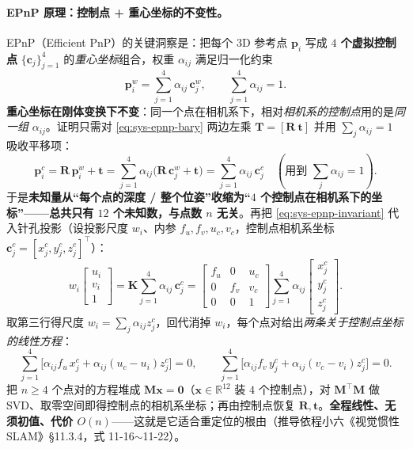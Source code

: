 \paragraph{EPnP 原理：控制点 + 重心坐标的不变性。}
EPnP（Efficient PnP）的关键洞察是：把每个 3D 参考点 $\mathbf{p}_i$ 写成 \textbf{$4$ 个虚拟控制点} $\{\mathbf{c}_j\}_{j=1}^4$ 的\emph{重心坐标}组合，权重 $\alpha_{ij}$ 满足归一化约束
\begin{equation}
\mathbf{p}_i^{w}=\sum_{j=1}^{4}\alpha_{ij}\,\mathbf{c}_j^{w},\qquad
\sum_{j=1}^{4}\alpha_{ij}=1 .
\label{eq:sys-epnp-bary}
\end{equation}
\textbf{重心坐标在刚体变换下不变}：同一个点在相机系下，相对\emph{相机系的控制点}用的是\emph{同一组} $\alpha_{ij}$。证明只需对 \cref{eq:sys-epnp-bary} 两边左乘 $\mathbf{T}=[\mathbf{R}\ \mathbf{t}]$ 并用 $\sum_j\alpha_{ij}=1$ 吸收平移项：
\begin{equation}
\mathbf{p}_i^{c}=\mathbf{R}\,\mathbf{p}_i^{w}+\mathbf{t}
=\sum_{j=1}^{4}\alpha_{ij}\big(\mathbf{R}\,\mathbf{c}_j^{w}+\mathbf{t}\big)
=\sum_{j=1}^{4}\alpha_{ij}\,\mathbf{c}_j^{c}
\quad(\text{用到 }\textstyle\sum_j\alpha_{ij}=1).
\label{eq:sys-epnp-invariant}
\end{equation}
于是\textbf{未知量从“每个点的深度 / 整个位姿”收缩为“$4$ 个控制点在相机系下的坐标”——总共只有 $12$ 个未知数，与点数 $n$ 无关}。再把 \cref{eq:sys-epnp-invariant} 代入针孔投影（设投影尺度 $w_i$、内参 $f_u,f_v,u_c,v_c$，控制点相机系坐标 $\mathbf{c}_j^c=[x_j^c,y_j^c,z_j^c]^\top$）：
\begin{equation}
w_i\begin{bmatrix}u_i\\ v_i\\ 1\end{bmatrix}
=\mathbf{K}\sum_{j=1}^{4}\alpha_{ij}\,\mathbf{c}_j^{c}
=\begin{bmatrix}f_u&0&u_c\\ 0&f_v&v_c\\ 0&0&1\end{bmatrix}
\sum_{j=1}^{4}\alpha_{ij}\begin{bmatrix}x_j^c\\ y_j^c\\ z_j^c\end{bmatrix}.
\label{eq:sys-epnp-proj}
\end{equation}
取第三行得尺度 $w_i=\sum_{j}\alpha_{ij}z_j^c$，回代消掉 $w_i$，每个点对给出\emph{两条关于控制点坐标的线性方程}：
\begin{equation}
\sum_{j=1}^{4}\!\big[\alpha_{ij}f_u\,x_j^c+\alpha_{ij}(u_c-u_i)z_j^c\big]=0,\qquad
\sum_{j=1}^{4}\!\big[\alpha_{ij}f_v\,y_j^c+\alpha_{ij}(v_c-v_i)z_j^c\big]=0 .
\label{eq:sys-epnp-linear}
\end{equation}
把 $n\ge 4$ 个点对的方程堆成 $\mathbf{M}\mathbf{x}=\mathbf{0}$（$\mathbf{x}\in\mathbb{R}^{12}$ 装 $4$ 个控制点），对 $\mathbf{M}^\top\mathbf{M}$ 做 SVD、取零空间即得控制点的相机系坐标；再由控制点恢复 $\mathbf{R},\mathbf{t}$。\textbf{全程线性、无须初值、代价 $O(n)$}——这就是它适合重定位的根由（推导依程小六《视觉惯性 SLAM》§11.3.4，式 11-16$\sim$11-22）。

